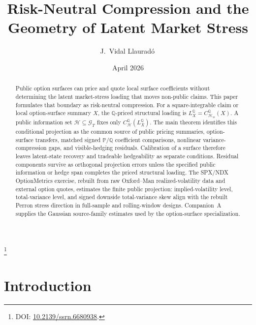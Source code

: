 \documentclass[11pt,a4paper]{amsart}
\theoremstyle{plain}
\theoremstyle{definition}
\theoremstyle{remark}
\newcommand{\PP}{\mathbb{P}}
\newcommand{\QQ}{\mathbb{Q}}
\newcommand{\cG}{\mathcal{G}}
\newcommand{\cH}{\mathcal{H}}
\begin{document}
\title[Risk-Neutral Compression]{%
Risk-Neutral Compression and the Geometry of Latent Market Stress}
\author[J.~Vidal Llaurad\'o]{J.~Vidal Llaurad\'o\,}
\thanks{DOI: \href{https://doi.org/10.2139/ssrn.6680938}{10.2139/ssrn.6680938}.}
\date{April 2026}

\begin{abstract}
Public option surfaces can price and quote local surface coefficients without determining the
latent market-stress loading that moves non-public claims.  This paper formulates that boundary as
risk-neutral compression.  For a square-integrable claim or local option-surface summary \(X\), the
\(\QQ\)-priced structural loading is
\(L_X^\QQ=C_{\cH_\varpi}^{\QQ}(X)\).  A public information set
\(\cH\subseteq\cG_T\) fixes only
\(C_{\cH}^{\QQ}(L_X^\QQ)\).  The main theorem identifies this conditional projection as the common
source of public pricing summaries, option-surface transfers, matched signed \(\PP/\QQ\) coefficient
comparisons, nonlinear variance-compression gaps, and visible-hedging residuals.  Calibration of a
surface therefore leaves latent-state recovery and tradeable hedgeability as separate conditions.
Residual components survive as orthogonal projection errors unless the specified public information
or hedge span completes the priced structural loading.  The SPX/NDX
OptionMetrics exercise, rebuilt from raw Oxford--Man realized-volatility data and external option
quotes, estimates the finite public projection: implied-volatility level, total-variance level, and
signed downside total-variance skew align with the rebuilt Perron stress direction in full-sample
and rolling-window designs.  Companion~A supplies the Gaussian source-family estimates used by the
option-surface specialization.
\end{abstract}

\maketitle

\section{Introduction}\label{sec:intro}
\end{document}
